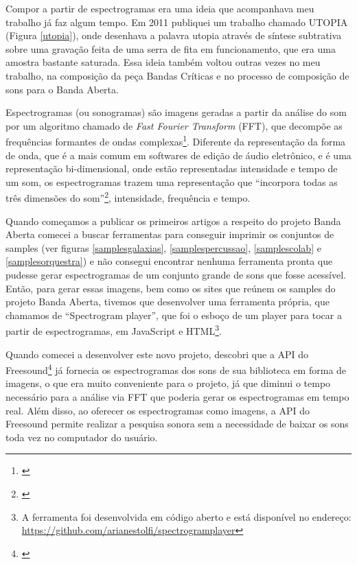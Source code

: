 Compor a partir de espectrogramas era uma ideia que acompanhava meu trabalho já faz algum tempo. Em 2011 publiquei um trabalho chamado UTOPIA (Figura \ref{utopia}), onde desenhava a palavra utopia através de síntese subtrativa sobre uma gravação feita de uma serra de fita em funcionamento, que era uma amostra bastante saturada. Essa ideia também voltou outras vezes no meu trabalho, na composição da peça Bandas Críticas e no processo de composição de sons para o Banda Aberta. 

Espectrogramas (ou sonogramas) são imagens geradas a partir da análise do som por um algoritmo chamado de \emph{Fast Fourier Transform} (FFT), que decompõe as frequências formantes de ondas complexas\footnote{\cite[55]{Roads}}. Diferente da representação da forma de onda, que é a mais comum em softwares de edição de áudio eletrônico, e é uma representação bi-dimensional, onde estão representadas intensidade e tempo de um som, os espectrogramas trazem uma representação que ``incorpora todas as três dimensões do som''\footnote{\cite{Schafer2011}}, intensidade, frequência e tempo. 


Quando começamos a publicar os primeiros artigos a respeito do projeto Banda Aberta comecei a buscar ferramentas para conseguir imprimir os conjuntos de samples (ver figuras \ref{samplesgalaxias}, \ref{samplespercussao}, \ref{samplescolab} e \ref{samplesorquestra}) e não consegui encontrar nenhuma ferramenta pronta que pudesse gerar espectrogramas de um conjunto grande de sons que fosse acessível. Então, para gerar essas imagens, bem como os sites que reúnem os samples do projeto Banda Aberta, tivemos que desenvolver uma ferramenta própria, que chamamos de ``Spectrogram player'', que foi o esboço de um player para tocar a partir de espectrogramas, em JavaScript e HTML\footnote{A ferramenta foi desenvolvida em código aberto e está disponível no endereço: \url{https://github.com/arianestolfi/spectrogramplayer}}. 

Quando comecei a desenvolver este novo projeto, descobri que a API do Freesound\footnote{\cite{Akkermans2011}} já fornecia os espectrogramas dos sons de sua biblioteca em forma de imagens, o que era muito conveniente para o projeto, já que diminui o tempo necessário para a análise via FFT que poderia gerar os espectrogramas em tempo real. Além disso, ao oferecer os espectrogramas como imagens, a API do Freesound permite realizar a pesquisa sonora sem a necessidade de baixar os sons toda vez no computador do usuário.

